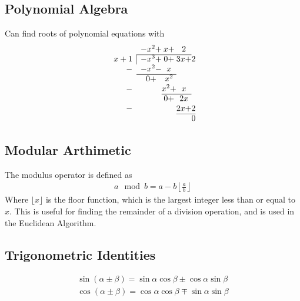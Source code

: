 \subsection{Polynomial Algebra}

Can find roots of polynomial equations with
$$
\begin{array}{rc@{}c@{}c@{}c@{}}
& -x^2 +& x + &2 & \\ \cline{2-4}
\multicolumn{1}{r|}{x+1} &-x^3+ & 0 + & 3x +&2\\
-&-x^2 -&x  &\\ \cline{2-3}
& 0 +& x^2 &\\ 
-&  & x^2 +&x\\ \cline{3-4}
& & 0 +&2x &\\ 
-& &  &2x +&2\\ \cline{4-5}
& & & &0\\
\end{array}
$$

\subsection{Modular Arthimetic}

The modulus operator is defined as
\begin{align}
a \mod b = a - b\left\lfloor\frac{a}{b}\right\rfloor
\end{align}
Where $\lfloor x \rfloor$ is the floor function, which is the largest integer less than or equal to $x$. This is useful for finding the remainder of a division operation, and is used in the Euclidean Algorithm.

\subsection{Trigonometric Identities}

\begin{align}
\sin(\alpha\pm\beta) = \sin\alpha\cos\beta\pm\cos\alpha\sin\beta\\
\cos(\alpha\pm\beta) = \cos\alpha\cos\beta\mp\sin\alpha\sin\beta
\end{align}

